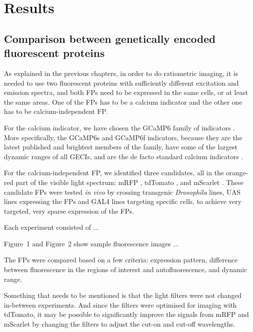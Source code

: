 \chapter{Results}

\ifpdf
    \graphicspath{{Chapter3/Figs/Raster/}{Chapter3/Figs/PDF/}{Chapter3/Figs/}}
\else
    \graphicspath{{Chapter3/Figs/Vector/}{Chapter3/Figs/}}
\fi

\section{Comparison between genetically encoded fluorescent proteins}



As explained in the previous chapters, in order to do ratiometric imaging, it is needed to use two
fluorescent proteins with sufficiently different excitation and emission spectra, and both FPs need
to be expressed in the same cells, or at least the same areas. One of the FPs has to be a calcium
indicator and the other one has to be calcium-independent FP.


For the calcium indicator, we have chosen the GCaMP6 family of indicators
\citep{nakai2001high,chen2013ultrasensitive}. More specifically, the GCaMP6s and GCaMP6f
indicators, because they are the latest published and brightest members of the family, have some
of the largest dynamic ranges of all GECIs, and are the de facto standard calcium indicators
\citep{lin2016genetically}.


For the calcium-independent FP, we identified three candidates, all in the orange-red part of the
visible light spectrum: mRFP \citep{campbell2002monomeric}, tdTomato \citep{shaner2004improved}, and
mScarlet \citep{bindels2017mscarlet}. These candidate FPs were tested \textit{in vivo} by crossing
transgenic \textit{Drosophila} lines, UAS lines expressing the FPs and GAL4 lines targeting specific
cells, to achieve very targeted, very sparse expression of the FPs.

Each experiment consisted of ...

Figure~1 and Figure~2 show sample fluorescence images ...

The FPs were compared based on a few criteria: expression pattern, difference between fluorescence
in the regions of interest and autofluorescence, and dynamic range.


Something that needs to be mentioned is that the light filters were not changed in-between
experiments. And since the filters were optimised for imaging with tdTomato, it may be
possible to significantly improve the signals from mRFP and mScarlet by changing the filters to
adjust the cut-on and cut-off wavelengths.
